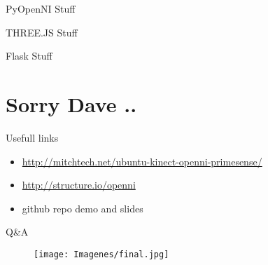 \documentclass[bigger]{beamer}
\begin{document}
\begin{frame}{\ECFAugie PyOpenNI Stuff}
\end{frame}


\begin{frame}{\ECFAugie THREE.JS Stuff}
\end{frame}


\begin{frame}{\ECFAugie Flask Stuff}
\end{frame}

\section{Sorry Dave ..}

\begin{frame}{\ECFAugie Usefull links}
\begin{itemize}
	\item \url{http://mitchtech.net/ubuntu-kinect-openni-primesense/}
	\item \url{http://structure.io/openni}
	\item github repo demo and slides 
\end{itemize}
\end{frame}

\begin{frame}{\ECFAugie Q\&A}
\begin{figure}[h]
		\texttt{[image: Imagenes/final.jpg]}
\end{figure}
\end{frame}
\end{document}
